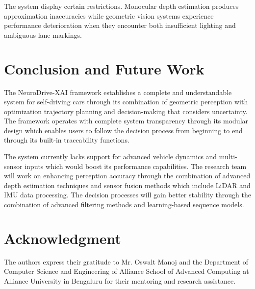 \documentclass[conference]{IEEEtran}
\begin{document}
The system display certain restrictions. Monocular depth estimation produces approximation inaccuracies while geometric vision systems experience performance deterioration when they encounter both insufficient lighting and ambiguous lane markings. 

\section{Conclusion and Future Work}
The NeuroDrive-XAI framework establishes a complete and understandable system for self-driving cars through its combination of geometric perception with optimization trajectory planning and decision-making that considers uncertainty. The framework operates with complete system transparency through its modular design which enables users to follow the decision process from beginning to end through its built-in traceability functions.

The system currently lacks support for advanced vehicle dynamics and multi-sensor inputs which would boost its performance capabilities. The research team will work on enhancing perception accuracy through the combination of advanced depth estimation techniques and sensor fusion methods which include LiDAR and IMU data processing. The decision processes will gain better stability through the combination of advanced filtering methods and learning-based sequence models.

\section*{Acknowledgment}
The authors express their gratitude to Mr. Oswalt Manoj and the Department of Computer Science and Engineering of Alliance School of Advanced Computing at Alliance University in Bengaluru for their mentoring and research assistance.
\end{document}
